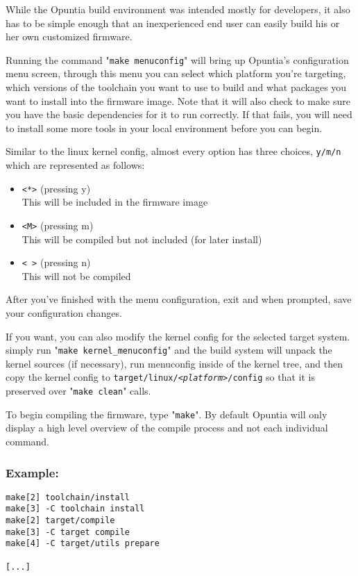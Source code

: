 While the Opuntia build environment was intended mostly for developers, it also has to be
simple enough that an inexperienced end user can easily build his or her own customized firmware.

Running the command "\texttt{make menuconfig}" will bring up Opuntia's configuration menu
screen, through this menu you can select which platform you're targeting, which versions of
the toolchain you want to use to build and what packages you want to install into the
firmware image. Note that it will also check to make sure you have the basic dependencies for it
to run correctly.  If that fails, you will need to install some more tools in your local environment
before you can begin.

Similar to the linux kernel config, almost every option has three choices,
\texttt{y/m/n} which are represented as follows:

\begin{itemize}
    \item{\texttt{<*>} (pressing y)} \\
        This will be included in the firmware image
    \item{\texttt{<M>} (pressing m)} \\
        This will be compiled but not included (for later install)
    \item{\texttt{< >} (pressing n)} \\
        This will not be compiled
\end{itemize}

After you've finished with the menu configuration, exit and when prompted, save your
configuration changes.

If you want, you can also modify the kernel config for the selected target system.
simply run "\texttt{make kernel\_menuconfig}" and the build system will unpack the kernel sources
(if necessary), run menuconfig inside of the kernel tree, and then copy the kernel config
to \texttt{target/linux/\textit{<platform>}/config} so that it is preserved over
"\texttt{make clean}" calls.

To begin compiling the firmware, type "\texttt{make}". By default
Opuntia will only display a high level overview of the compile process and not each individual
command.

\subsubsection{Example:}

\begin{Verbatim}
make[2] toolchain/install
make[3] -C toolchain install
make[2] target/compile
make[3] -C target compile
make[4] -C target/utils prepare

[...]
\end{Verbatim}

